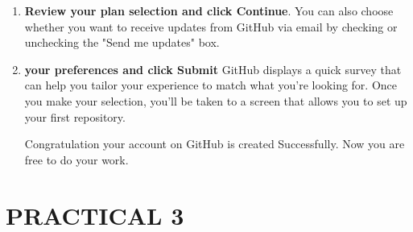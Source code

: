\documentclass[12pt]{article}
\begin{document}
\begin{enumerate}
\item \textbf{Review your plan selection and click Continue}. You can also choose whether you want to receive updates from GitHub via email by checking or unchecking the "Send me updates" box.

\item \textbf{your preferences and click Submit} GitHub displays a quick survey that can help you
tailor your experience to match what you're looking for. Once you make your selection, you'll be taken to a screen that allows you to set up your first repository.

Congratulation your account on GitHub is created Successfully. Now you are
free to do your work.

\end{enumerate}


\section{PRACTICAL 3}
\end{document}
